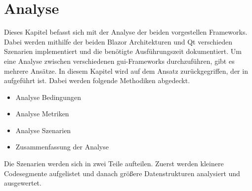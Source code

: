 \chapter{Analyse}
\label{chp:analyse}
Dieses Kapitel befasst sich mit der Analyse der beiden vorgestellen Frameworks. Dabei
werden mithilfe der beiden Blazor Architekturen und Qt verschieden Szenarien implementiert und
die benötigte Ausführungszeit dokumentiert.
\newline
\newline
Um eine Analyse zwischen verschiedenen \ac{gui}-Frameworks durchzuführen, gibt es mehrere Ansätze.
In diesem Kapitel wird auf dem Ansatz zurückgegriffen, der in \cite{JavaVsCSharp} aufgeführt ist. Dabei werden
folgende Methodiken abgedeckt.

\begin{itemize}
    \item Analyse Bedingungen
    \item Analyse Metriken
    \item Analyse Szenarien
    \item Zusammenfassung der Analyse
\end{itemize}

Die Szenarien werden sich in zwei Teile aufteilen. Zuerst werden kleinere Codesegmente
aufgelistet und danach größere Datenstrukturen analysiert und ausgewertet.




